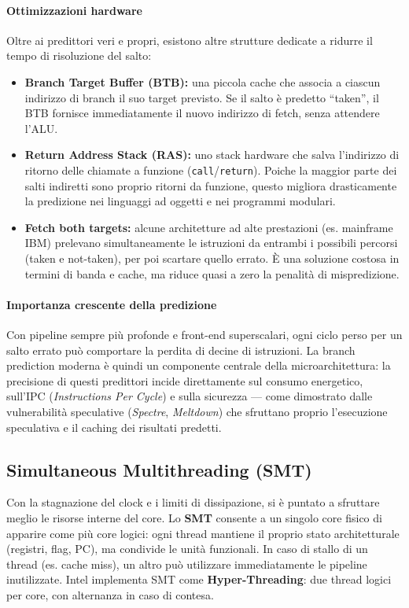 \paragraph{Ottimizzazioni hardware}
Oltre ai predittori veri e propri, esistono altre strutture dedicate a ridurre il tempo di risoluzione del salto:
\begin{itemize}
  \item \textbf{Branch Target Buffer (BTB):} una piccola cache che associa a ciascun indirizzo di branch il suo target previsto.  
        Se il salto è predetto “taken”, il BTB fornisce immediatamente il nuovo indirizzo di fetch, senza attendere l’ALU.
  \item \textbf{Return Address Stack (RAS):} uno stack hardware che salva l’indirizzo di ritorno delle chiamate a funzione (\texttt{call}/\texttt{return}).  
        Poiche la maggior parte dei salti indiretti sono proprio ritorni da funzione, questo migliora drasticamente la predizione nei linguaggi ad oggetti e nei programmi modulari.
  \item \textbf{Fetch both targets:} alcune architetture ad alte prestazioni (es. mainframe IBM) prelevano simultaneamente le istruzioni da entrambi i possibili percorsi (taken e not-taken), per poi scartare quello errato.  
        È una soluzione costosa in termini di banda e cache, ma riduce quasi a zero la penalità di mispredizione.
\end{itemize}

\paragraph{Importanza crescente della predizione}
Con pipeline sempre più profonde e front-end superscalari, ogni ciclo perso per un salto errato può comportare la perdita di decine di istruzioni.  
La branch prediction moderna è quindi un componente centrale della microarchitettura: la precisione di questi predittori incide direttamente sul consumo energetico, sull’IPC (\emph{Instructions Per Cycle}) e sulla sicurezza — come dimostrato dalle vulnerabilità speculative (\emph{Spectre}, \emph{Meltdown}) che sfruttano proprio l’esecuzione speculativa e il caching dei risultati predetti.



\subsection{Simultaneous Multithreading (SMT)}
Con la stagnazione del clock e i limiti di dissipazione, si è puntato a sfruttare meglio le risorse interne del core.  
Lo \textbf{SMT} consente a un singolo core fisico di apparire come più core logici: ogni thread mantiene il proprio stato architetturale (registri, flag, PC), ma condivide le unità funzionali.  
In caso di stallo di un thread (es. cache miss), un altro può utilizzare immediatamente le pipeline inutilizzate.  
Intel implementa SMT come \textbf{Hyper-Threading}: due thread logici per core, con alternanza in caso di contesa.

